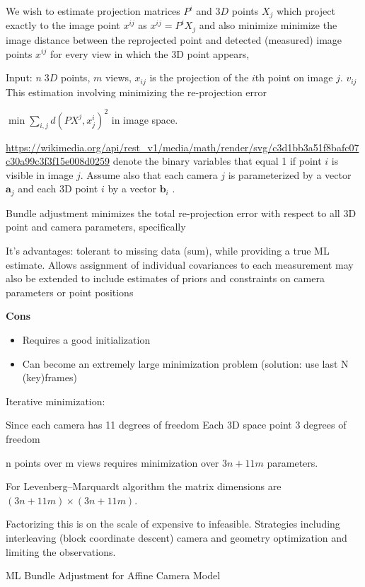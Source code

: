 We wish to estimate projection matrices $P^i$ and $3D$ points $X_j$ which project exactly to the image point $x^{ij}$ as $x^{ij} = P^i X_j$ and also minimize minimize the image distance between the reprojected point and detected (measured) image points $x^{ij}$ for every view in which the 3D point appears,

Input: $n \; 3D$ points, $m$ views, $x_{ij}$ is the projection of the $i$th point on image $j$. $v_{ij}$
This estimation involving minimizing the re-projection error 

$\min \sum_{i,j} d(P X^j, x_j^i)^2 $ in image space.

\url{https://wikimedia.org/api/rest_v1/media/math/render/svg/c3d1bb3a51f8bafc07c30a99c3f3f15e008d0259}
 denote the binary variables that equal 1 if point $i$ is visible in image $j$. Assume also that each camera $j$  is parameterized by a vector $\mathbf{a}_{j}$ and each 3D point $i$ by a vector $\mathbf{b}_{i}$ . 

Bundle adjustment minimizes the total re-projection error with respect to all 3D point and camera parameters, specifically

It's advantages: tolerant to missing data (sum), while providing a true ML estimate. 
Allows assignment of individual covariances to each measurement
may also be extended to include estimates of priors and constraints on camera parameters or point positions

\textbf{Cons}
\begin{itemize}
\item Requires a good initialization 
\item Can become an extremely large minimization problem (solution: use last N (key)frames)
\end{itemize}

Iterative minimization:

Since each camera has 11 degrees of freedom 
Each 3D space point 3 degrees of freedom

n points over m views requires minimization over $3n + 11m$ parameters. 

For Levenberg–Marquardt algorithm the matrix dimensions are $(3n + 11m)\times (3n + 11m)$. 

Factorizing this is on the scale of expensive to infeasible. Strategies including interleaving (block coordinate descent) camera and geometry optimization and limiting the observations.

ML Bundle Adjustment for Affine Camera Model

